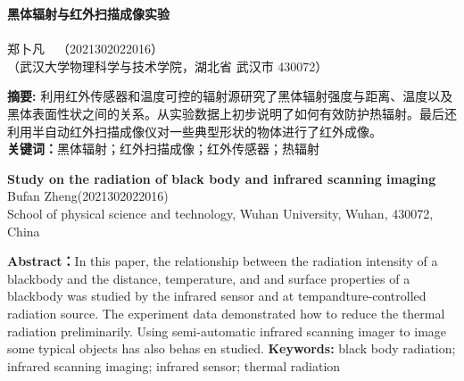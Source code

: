 \documentclass{WHUReport}
\newcommand{\name}{郑卜凡}
\newcommand{\stuid}{2021302022016}
\newcommand{\Name}{Bufan Zheng}
\newcommand{\newtitle}{黑体辐射与红外扫描成像实验}
\newcommand{\Title}{Study on the radiation of black body and infrared scanning imaging
}
\begin{document}
\pagestyle{maincontent} 
%

\begin{center}
 \textbf{\newtitle}\\
~\\
 \kaishu \name \ \ （\stuid）\\
 \kaishu （武汉大学物理科学与技术学院，湖北省 武汉市 430072）\\
\end{center}
\textbf{摘\quad 要:}
利用红外传感器和温度可控的辐射源研究了黑体辐射强度与距离、温度以及黑体表面性状之间的关系。从实验数据上初步说明了如何有效防护热辐射。最后还利用半自动红外扫描成像仪对一些典型形状的物体进行了红外成像。\\
\textbf{关键词：}黑体辐射；红外扫描成像；红外传感器；热辐射
~\\
\begin{center}
	\textbf{\Title}\\
	 \Name\quad (\stuid)\\
	 School of physical science and technology, Wuhan University, Wuhan, 430072, China
\end{center}

\textbf{Abstract：}In this paper, the relationship between the radiation intensity of a blackbody and the distance, temperature, and and surface properties of a blackbody was studied by the infrared sensor and at tempandture-controlled radiation source. The experiment data demonstrated how to reduce the thermal radiation preliminarily. Using semi-automatic infrared scanning imager to image some typical objects has also behas en studied.
\textbf{Keywords: }black body radiation; infrared scanning imaging; infrared sensor; thermal radiation
\end{document}
